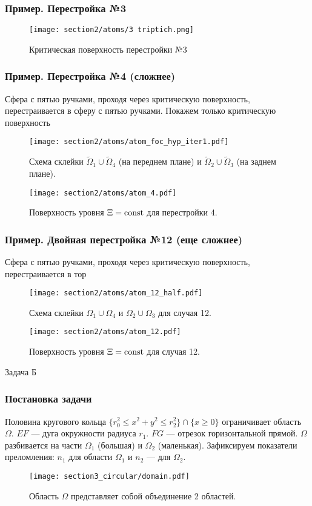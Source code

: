 \begin{frame}\frametitle{Пример. Перестройка №3}
\begin{figure}[!htb]
\centering
\texttt{[image: section2/atoms/3 triptich.png]}
    \caption{Критическая поверхность перестройки №3}
\end{figure}
\end{frame}

\begin{frame}\frametitle{Пример. Перестройка №4 (сложнее)}
\qq  Сфера с пятью ручками, проходя через критическую поверхность, перестраивается в сферу с пятью ручками.  Покажем только критическую поверхность\begin{figure}[!htb]
\centering
\texttt{[image: section2/atoms/atom\_foc\_hyp\_iter1.pdf]}
    \caption{Схема склейки $\widetilde{\Omega}_1 \cup \widetilde{\Omega}_4$ (на переднем плане) и $\widetilde{\Omega}_2 \cup \widetilde{\Omega}_3$ (на заднем плане).}
    \label{fig:sect2_atom_foc_hyp_iter1}
    \endminipage\hfill
{}
    \centering
\texttt{[image: section2/atoms/atom\_4.pdf]}
    \caption{Поверхность уровня $\Xi = \mathrm{const}$ для перестройки 4.}
    \label{fig:sect2_atom_4}
\endminipage\hfill
\end{figure}
\end{frame}

\begin{frame}\frametitle{Пример. Двойная перестройка №12 (еще сложнее)}
\qq Сфера с пятью ручками, проходя через критическую поверхность, перестраивается в тор
\begin{figure}[!htb]
\centering
\texttt{[image: section2/atoms/atom\_12\_half.pdf]}
    \caption{Схема склейки $\Omega_1 \cup \Omega_4$ и $\Omega_2 \cup \Omega_3$ для случая 12.}
    \label{fig:sect2_atom_12_half}
\endminipage\hfill
{}
\centering
\texttt{[image: section2/atoms/atom\_12.pdf]}
    \caption{Поверхность уровня $\Xi = \mathrm{const}$ для случая 12.}
    \label{fig:sect2_atom_12}
\endminipage\hfill
\end{figure}
\end{frame}

\begin{frame}\LARGE\center Задача Б\end{frame}

\begin{frame}\frametitle{Постановка задачи}

\qq Половина кругового кольца $\{r_0^2 \leq x^2 + y^2 \leq r_2^2\} \cap \{x\geq 0\}$ ограничивает область $\Omega$.
$EF$ --- дуга окружности радиуса $r_1$. $FG$ --- отрезок горизонтальной прямой.  $\Omega$ разбивается на части $\Omega_1$ (большая) и $\Omega_2$ (маленькая). Зафиксируем показатели преломления: $n_1$ для области $\Omega_1$ и $n_2$ --- для  $\Omega_2$.
\begin{figure}[!htb]
\centering
\texttt{[image: section3\_circular/domain.pdf]}
    \caption{Область $\Omega$ представляет собой объединение 2 областей.}
    \label{fig:sect3_domain}
\end{figure}
\end{frame}

